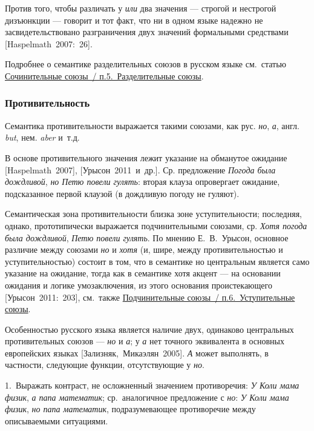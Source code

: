 Против того, чтобы различать у \textit{или} два значения --- строгой и
нестрогой дизъюнкции --- говорит и тот факт, что ни в одном языке надежно
не засвидетельствовано разграничения двух значений формальными
средствами {[}Haspelmath~2007:~26{]}.

Подробнее о семантике разделительных союзов в русском языке см.~статью
\underline{Сочинительные союзы~/ п.5.~Разделительные союзы}.

\subsubsection{Противительность}\label{ux43fux440ux43eux442ux438ux432ux438ux442ux435ux43bux44cux43dux43eux441ux442ux44c}

Семантика противительности выражается такими союзами, как рус.
\textit{но}, \textit{а}, англ. \textit{but}, нем. \textit{aber} и~т.д.

В основе противительного значения лежит указание на обманутое ожидание
{[}Haspelmath~2007{]}, {[}Урысон~2011~и~др.{]}. Ср. предложение
\textit{Погода была дождливой}, \textit{но Петю повели гулять}: вторая
клауза опровергает ожидание, подсказанное первой клаузой (в дождливую
погоду не гуляют).

Семантическая зона противительности близка зоне уступительности;
последняя, однако, прототипически выражается подчинительными союзами,
ср. \textit{Хотя погода была дождливой}, \textit{Петю повели гулять}. По
мнению Е.~В.~Урысон, основное различие между союзами \textit{но} и
\textit{хотя} (и, шире, между противительностью и уступительностью)
состоит в том, что в семантике но центральным является само указание на
ожидание, тогда как в семантике хотя акцент --- на основании ожидания и
логике умозаключения, из этого основания проистекающего
{[}Урысон~2011:~203{]}, см.~также \underline{Подчинительные союзы~/
  п.6.~Уступительные союзы}.

Особенностью русского языка является наличие двух, одинаково центральных
противительных союзов --- \textit{но} и \textit{а}; у \textit{а} нет точного
эквивалента в основных европейских языках {[}Зализняк,~Микаэлян~2005{]}.
\textit{А} может выполнять, в частности, следующие функции, отсутствующие
у \textit{но}.

1.~Выражать контраст, не осложненный значением противоречия: \textit{У
  Коли мама физик}, \textit{а папа математик}; ср.~аналогичное предложение с
\textit{но}: \textit{У Коли мама физик}, \textit{но папа математик},
подразумевающее противоречие между описываемыми ситуациями.

